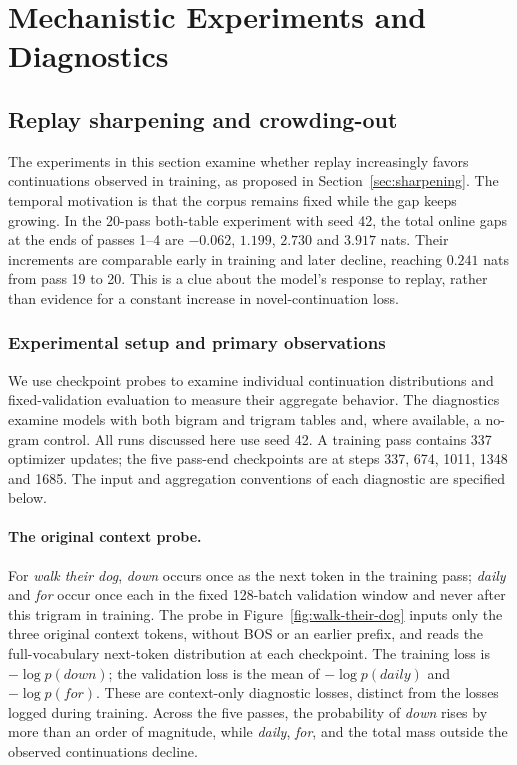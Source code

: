 \section{Mechanistic Experiments and Diagnostics}
\label{app:mechanistic}

\subsection{Replay sharpening and crowding-out}
\label{app:sharpening}
\label{app:replay-clue}

The experiments in this section examine whether replay increasingly favors continuations observed in training, as proposed in Section~\ref{sec:sharpening}. The temporal motivation is that the corpus remains fixed while the gap keeps growing. In the 20-pass both-table experiment with seed 42, the total online gaps at the ends of passes 1--4 are $-0.062$, $1.199$, $2.730$ and $3.917$ nats. Their increments are comparable early in training and later decline, reaching $0.241$ nats from pass 19 to 20. This is a clue about the model's response to replay, rather than evidence for a constant increase in novel-continuation loss.

\subsubsection{Experimental setup and primary observations}
\label{app:sharpening-setup}

We use checkpoint probes to examine individual continuation distributions and fixed-validation evaluation to measure their aggregate behavior. The diagnostics examine models with both bigram and trigram tables and, where available, a no-gram control. All runs discussed here use seed 42. A training pass contains 337 optimizer updates; the five pass-end checkpoints are at steps 337, 674, 1011, 1348 and 1685. The input and aggregation conventions of each diagnostic are specified below.

\paragraph{The original context probe.}
For \emph{walk their dog}, \emph{down} occurs once as the next token in the training pass; \emph{daily} and \emph{for} occur once each in the fixed 128-batch validation window and never after this trigram in training. The probe in Figure~\ref{fig:walk-their-dog} inputs only the three original context tokens, without BOS or an earlier prefix, and reads the full-vocabulary next-token distribution at each checkpoint. The training loss is $-\log p(\textit{down})$; the validation loss is the mean of $-\log p(\textit{daily})$ and $-\log p(\textit{for})$. These are context-only diagnostic losses, distinct from the losses logged during training. Across the five passes, the probability of \emph{down} rises by more than an order of magnitude, while \emph{daily}, \emph{for}, and the total mass outside the observed continuations decline.


